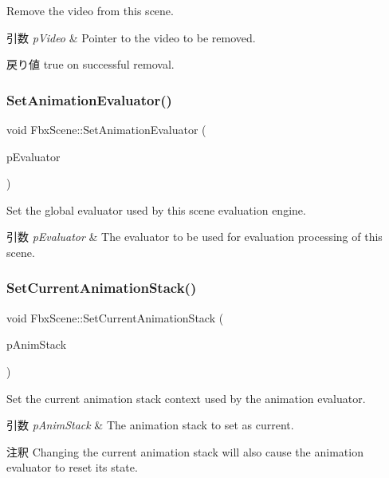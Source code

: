 Remove the video from this scene. 
\begin{DoxyParams}{引数}
{\em p\+Video} & Pointer to the video to be removed. \\
\hline
\end{DoxyParams}
\begin{DoxyReturn}{戻り値}
true on successful removal. 
\end{DoxyReturn}
\mbox{\label{class_fbx_scene_a7fd2f5602c943f1050488e379fc18755}} 
\subsubsection{\texorpdfstring{Set\+Animation\+Evaluator()}{SetAnimationEvaluator()}}
{\footnotesize\ttfamily void Fbx\+Scene\+::\+Set\+Animation\+Evaluator (\begin{DoxyParamCaption}\item[{\hyperlink{class_fbx_anim_evaluator}{Fbx\+Anim\+Evaluator} $\ast$}]{p\+Evaluator }\end{DoxyParamCaption})}

Set the global evaluator used by this scene evaluation engine. 
\begin{DoxyParams}{引数}
{\em p\+Evaluator} & The evaluator to be used for evaluation processing of this scene. \\
\hline
\end{DoxyParams}
\mbox{\label{class_fbx_scene_a19f5408a6460667dec584cd5363e3abe}} 
\subsubsection{\texorpdfstring{Set\+Current\+Animation\+Stack()}{SetCurrentAnimationStack()}}
{\footnotesize\ttfamily void Fbx\+Scene\+::\+Set\+Current\+Animation\+Stack (\begin{DoxyParamCaption}\item[{\hyperlink{class_fbx_anim_stack}{Fbx\+Anim\+Stack} $\ast$}]{p\+Anim\+Stack }\end{DoxyParamCaption})}

Set the current animation stack context used by the animation evaluator. 
\begin{DoxyParams}{引数}
{\em p\+Anim\+Stack} & The animation stack to set as current. \\
\hline
\end{DoxyParams}
\begin{DoxyRemark}{注釈}
Changing the current animation stack will also cause the animation evaluator to reset its state. 
\end{DoxyRemark}
\mbox{\label{class_fbx_scene_a486c147dc25d9bec4938852d2550cb81}} 
